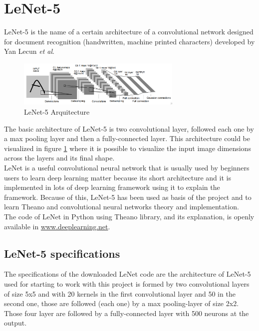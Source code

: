 \section{LeNet-5}
LeNet-5 \cite{Lenet5} is the name of a certain architecture of a convolutional network designed for document recognition (handwritten, machine printed characters) developed by Yan Lecun \textit{et al}.\\

\begin{figure}[htb]
  \centering
  \includegraphics[width=0.7\textwidth]{images/images_lenet/LenetArquitectura.png}
  \caption{LeNet-5 Arquitecture}
  \label{Lenet5Arquitectura}
\end{figure}

The basic architecture of LeNet-5 is two convolutional layer, followed each one by a max pooling layer and then a fully-connected layer. This architecture could be visualized in figure \ref{Lenet5Arquitectura} where it is possible to visualize the input image dimensions across the layers and its final shape.\\

LeNet is a useful convolutional neural network that is usually used by beginners users to learn deep learning matter because its short architecture and it is implemented in lots of deep learning framework using it to explain the framework. Because of this, LeNet-5 has been used as basis of the project and to learn Theano and convolutional neural networks theory and implementation.\\

The code of LeNet in Python using Theano library, and its explanation, is openly available in \url{www.deeplearning.net}.\\

\subsection{LeNet-5 specifications}
The specifications of the downloaded LeNet code are the architecture of LeNet-5 used for starting to work with this project is formed by two convolutional layers of size 5x5 and with 20 kernels in the first convolutional layer and 50 in the second one, those are followed (each one) by a max pooling-layer of size 2x2. Those four layer are followed by a fully-connected layer with 500 neurons at the output.\\

